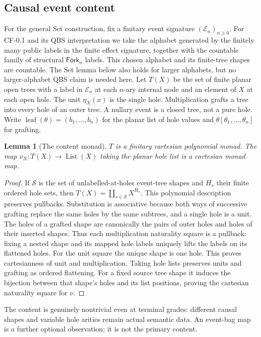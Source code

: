 \documentclass[11pt,a4paper]{article}
\newtheorem{lemma}[theorem]{Lemma}
\theoremstyle{definition}
\newcommand{\List}{\operatorname{List}}
\newcommand{\leaf}{\operatorname{leaf}}
\begin{document}
\subsection{Causal event content}
For the general Set construction, fix a finitary event signature
$(\mathcal E_n)_{n\ge0}$. For CF-0.1 and its QBS interpretation we take
the alphabet generated by the finitely many public labels in the finite
effect signature, together with the countable family of structural
$\mathsf{Fork}_n$ labels. This chosen alphabet and its finite-tree shapes
are countable. The Set lemma below also holds for larger alphabets, but
no larger-alphabet QBS claim is needed here. Let $T(X)$ be the
set of finite planar open trees with a label in $\mathcal E_n$ at each
$n$-ary internal node and an element of $X$ at each open hole. The unit
$\eta_X(x)$ is the single hole. Multiplication grafts a tree into every
hole of an outer tree. A nullary event is a closed tree, not a pure hole.
Write $\leaf(\theta)=(b_1,\ldots,b_n)$ for the planar list of hole values
and $\theta[\theta_1,\ldots,\theta_n]$ for grafting.

\begin{lemma}[The content monad]\label{lem:tree}
$T$ is a finitary cartesian polynomial monad. The map
$\nu_X:T(X)\to\List(X)$ taking the planar hole list is a cartesian monad
map.
\end{lemma}
\begin{proof}
If $\mathcal S$ is the set of unlabelled-at-holes event-tree shapes and
$H_s$ their finite ordered hole sets, then
$T(X)=\coprod_{s\in\mathcal S}X^{H_s}$. This polynomial description
preserves pullbacks. Substitution is associative because both ways of
successive grafting replace the same holes by the same subtrees, and a
single hole is a unit. The holes of a grafted shape are canonically the
pairs of outer holes and holes of their inserted shapes. Thus each
multiplication naturality square is a pullback: fixing a nested shape and
its mapped hole labels uniquely lifts the labels on its flattened holes.
For the unit square the unique shape is one hole. This proves cartesianness
of unit and multiplication. Taking hole lists preserves units and grafting
as ordered flattening. For a fixed source tree shape it induces the
bijection between that shape's holes and its list positions, proving the
cartesian naturality square for $\nu$.
\end{proof}
The content is genuinely nontrivial even at terminal grades: different
causal shapes and variable hole arities remain actual semantic data.
An event-bag map is a further optional observation; it is not the primary
content.
\end{document}
